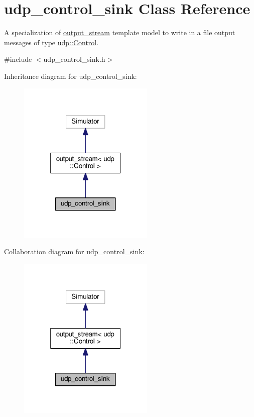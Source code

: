 \hypertarget{classudp__control__sink}{}\section{udp\+\_\+control\+\_\+sink Class Reference}
\label{classudp__control__sink}


A specialization of \hyperlink{classoutput__stream}{output\+\_\+stream} template model to write in a file output messages of type \hyperlink{structudp_1_1Control}{udp\+::\+Control}.  




{\ttfamily \#include $<$udp\+\_\+control\+\_\+sink.\+h$>$}



Inheritance diagram for udp\+\_\+control\+\_\+sink\+:\nopagebreak
\begin{figure}[H]
\begin{center}
\leavevmode
\includegraphics[width=184pt]{classudp__control__sink__inherit__graph}
\end{center}
\end{figure}


Collaboration diagram for udp\+\_\+control\+\_\+sink\+:\nopagebreak
\begin{figure}[H]
\begin{center}
\leavevmode
\includegraphics[width=184pt]{classudp__control__sink__coll__graph}
\end{center}
\end{figure}
